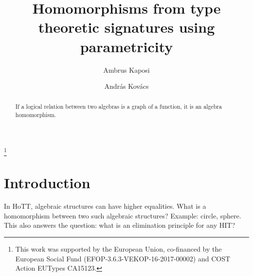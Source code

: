 \documentclass{lmcs} %
\theoremstyle{plain}\newtheorem{satz}[thm]{Satz} %
\begin{document}
\title[Short title TODO]{Homomorphisms from type theoretic signatures using parametricity}

\author[A.~Kaposi]{Ambrus Kaposi}	%
\address{Department of Programming Languages and Compilers, E{\"o}tv{\"o}s Lor{\'a}nd University, Budapest, Hungary}	%

\author[A.~Kov{\'a}cs]{Andr{\'a}s Kov{\'a}cs}	%
\address{Department of Programming Languages and Compilers, E{\"o}tv{\"o}s Lor{\'a}nd University, Budapest, Hungary}	%
\thanks{This work was supported by the European Union, co-financed by the
European Social Fund (EFOP-3.6.3-VEKOP-16-2017-00002) and COST Action
EUTypes CA15123.}	%





\begin{abstract}
  \noindent If a logical relation between two algebras is a graph of a
  function, it is an algebra homomorphism. 
\end{abstract}

\maketitle

\section*{Introduction}

In HoTT, algebraic structures can have higher equalities. What is a
homomorphism between two such algebraic structures? Example: circle,
sphere. This also answers the question: what is an elimination
principle for any HIT?
\end{document}
